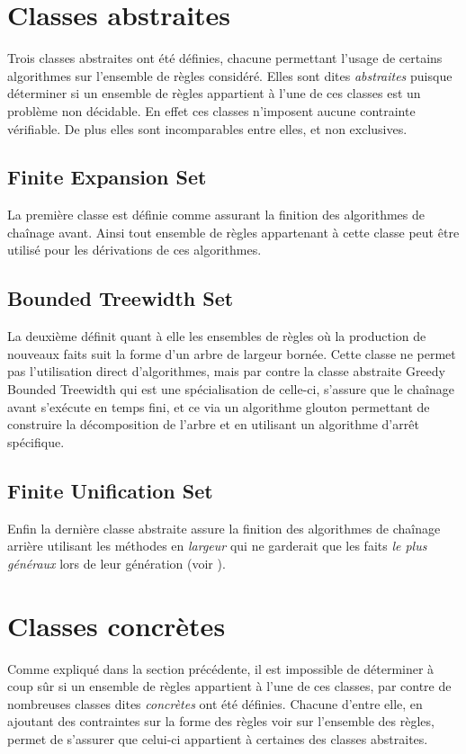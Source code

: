 
\section{Classes abstraites}\label{classes_abstraites}
Trois classes abstraites ont été définies, chacune permettant l'usage de certains
algorithmes sur l'ensemble de règles considéré.
Elles sont dites {\em abstraites} puisque déterminer si un ensemble de règles appartient
à l'une de ces classes est un problème non décidable. En effet ces classes n'imposent
aucune contrainte vérifiable.
De plus elles sont incomparables entre elles, et non exclusives. 

\subsection{Finite Expansion Set}\label{classes_abstraites_fus}
La première classe est définie comme assurant la finition des algorithmes de chaînage
avant. Ainsi tout ensemble de règles appartenant à cette classe peut être utilisé pour
les dérivations de ces algorithmes.

\subsection{Bounded Treewidth Set}\label{classes_abstraites_bts}
La deuxième définit quant à elle 
les ensembles de règles où la production de nouveaux faits suit la
forme d'un arbre de largeur bornée.
Cette classe ne permet pas l'utilisation direct d'algorithmes, mais par contre la classe
abstraite Greedy Bounded Treewidth qui est une spécialisation de celle-ci, s'assure que
le chaînage avant s'exécute en temps fini, et ce via un algorithme glouton permettant de
construire la décomposition de l'arbre et en utilisant un algorithme d'arrêt spécifique.

\subsection{Finite Unification Set}\label{classes_abstraites_fes}
Enfin la dernière classe abstraite assure la finition des algorithmes de chaînage
arrière utilisant les méthodes en {\em largeur} qui ne garderait que les faits {\em le plus
généraux} lors de leur génération (voir \cite{}).


\section{Classes concrètes}\label{classes_concretes}
Comme expliqué dans la section précédente, il est impossible de déterminer à coup sûr 
si un ensemble
de règles appartient à l'une de ces classes, par contre de nombreuses classes dites
{\em concrètes }
ont été définies. Chacune d'entre elle, en ajoutant des contraintes sur la forme des
règles voir sur l'ensemble des règles, 
permet de s'assurer que celui-ci appartient à certaines des classes
abstraites.

